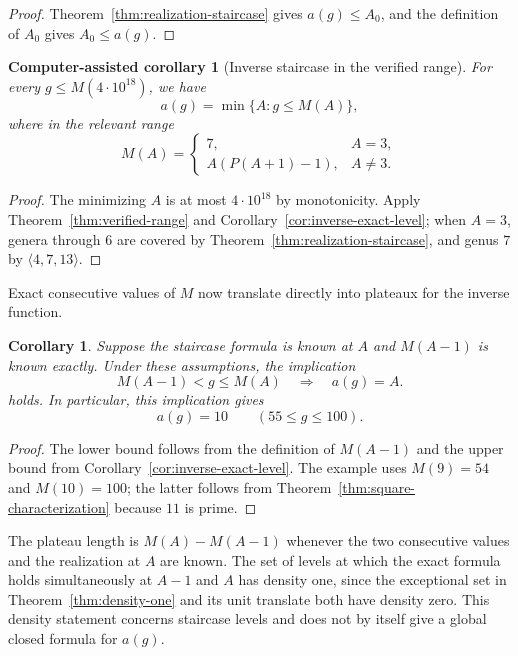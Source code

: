 \documentclass[11pt]{article}
\theoremstyle{plain}
\newtheorem{corollary}[theorem]{Corollary}
\newtheorem{computercorollary}[theorem]{Computer-assisted corollary}
\theoremstyle{definition}
\theoremstyle{remark}
\begin{document}
\begin{proof}
Theorem~\ref{thm:realization-staircase} gives $a(g)\leq A_0$, and the
definition of $A_0$ gives $A_0\leq a(g)$.
\end{proof}

\begin{computercorollary}[Inverse staircase in the verified range]
\label{cor:verified-inverse}
For every $g\leq M(4\cdot10^{18})$, we have
\[
  \boxed{a(g)=\min\{A:g\leq M(A)\},}
\]
where in the relevant range
\[
  M(A)=
  \begin{cases}
    7,&A=3,\\
    A(P(A+1)-1),&A\neq 3.
  \end{cases}
\]
\end{computercorollary}

\begin{proof}
The minimizing $A$ is at most $4\cdot10^{18}$ by monotonicity.  Apply
Theorem~\ref{thm:verified-range} and
Corollary~\ref{cor:inverse-exact-level}; when $A=3$, genera through $6$ are
covered by Theorem~\ref{thm:realization-staircase}, and genus $7$ by
$\langle4,7,13\rangle$.
\end{proof}

Exact consecutive values of $M$ now translate directly into plateaux for the
inverse function.

\begin{corollary}\label{cor:inverse-plateaux}
Suppose the staircase formula is known at $A$ and $M(A-1)$ is known exactly.
Under these assumptions, the implication
\[
  M(A-1)<g\leq M(A)
  \quad\Longrightarrow\quad
  \boxed{a(g)=A.}
\]
holds.
In particular, this implication gives
\[
  \boxed{a(g)=10\qquad(55\leq g\leq100).}
\]
\end{corollary}

\begin{proof}
The lower bound follows from the definition of $M(A-1)$ and the upper bound
from Corollary~\ref{cor:inverse-exact-level}.  The example uses
$M(9)=54$ and $M(10)=100$; the latter follows from
Theorem~\ref{thm:square-characterization} because $11$ is prime.
\end{proof}

The plateau length is $M(A)-M(A-1)$ whenever the two consecutive values and
the realization at $A$ are known.  The set of levels at which the exact
formula holds simultaneously at $A-1$ and $A$ has density one, since the
exceptional set in Theorem~\ref{thm:density-one} and its unit translate both
have density zero.  This density statement concerns staircase levels and
does not by itself give a global closed formula for $a(g)$.
\end{document}
